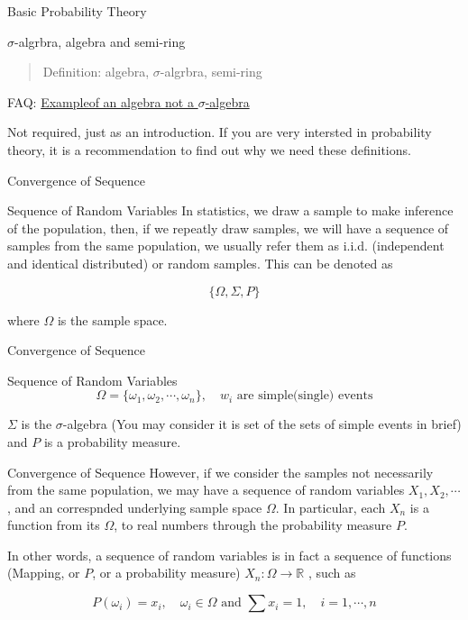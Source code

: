 \documentclass[
  ignorenonframetext,
  aspectratio=43,
]{beamer}
\begin{document}
\begin{frame}{Basic Probability Theory}
\label{basic-probability-theory}
\begin{block}{\(\sigma\)-algrbra, algebra and semi-ring}
\label{sigma-algrbra-algebra-and-semi-ring}
\begin{quote}
Definition: algebra, \(\sigma\)-algrbra, semi-ring
\end{quote}

FAQ:
\href{https://math.stackexchange.com/questions/233702/example-of-an-algebra-which-is-not-a-\%CF\%83-algebra}{Exampleof
an algebra not a \(\sigma\)-algebra}

Not required, just as an introduction. If you are very intersted in
probability theory, it is a recommendation to find out why we need these
definitions.
\end{block}
\end{frame}

\begin{frame}{Convergence of Sequence}
\label{convergence-of-sequence-2}
\begin{block}{Sequence of Random Variables}
\label{sequence-of-random-variables}
In statistics, we draw a sample to make inference of the population,
then, if we repeatly draw samples, we will have a sequence of samples
from the same population, we usually refer them as i.i.d. (independent
and identical distributed) or random samples. This can be denoted as

\[
\{\Omega,\Sigma,P\}
\]

where \(\Omega\) is the sample space.
\end{block}
\end{frame}

\begin{frame}{Convergence of Sequence}
\label{convergence-of-sequence-3}
\begin{block}{Sequence of Random Variables}
\label{sequence-of-random-variables-1}
\[
\Omega=\{\omega_1,\omega_2,\cdots, \omega_n\}, \quad w_i \text{ are simple(single) events}
\]

\(\Sigma\) is the \(\sigma\)-algebra (You may consider it is set of the
sets of simple events in brief) and \(P\) is a probability measure.
\end{block}
\end{frame}

\begin{frame}{Convergence of Sequence}
\label{convergence-of-sequence-4}
However, if we consider the samples not necessarily from the same
population, we may have a sequence of random variables
\(X_1,X_2,\cdots\), and an correspnded underlying sample space
\(\Omega\). In particular, each \(X_n\) is a function from its
\(\Omega\), to real numbers through the probability measure \(P\).

In other words, a sequence of random variables is in fact a sequence of
functions (Mapping, or \(P\), or a probability measure)
\(X_n:\Omega\rightarrow \mathbb{R}\) , such as

\[
P(\omega_i)=x_i, \quad \omega_i \in \Omega \text{ and } \sum x_i=1, \quad i = 1,\cdots,n
\]
\end{frame}
\end{document}
